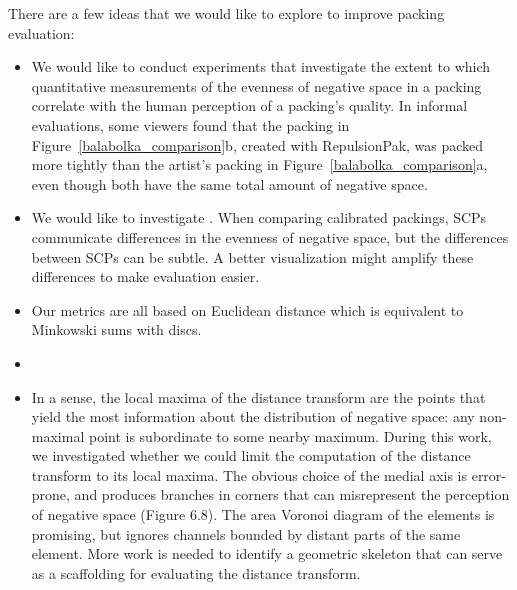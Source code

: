 \nnewtext
{
There are a few ideas that we would like to explore to improve packing evaluation:}
\begin{itemize}
\item We would like to conduct experiments that investigate the
extent to which quantitative measurements of the evenness of negative
space in a packing correlate with the human perception of a
packing's quality.  In informal evaluations, some viewers found that
the packing in Figure~\ref{balabolka_comparison}b, created with RepulsionPak,
was packed more tightly than the artist's packing in
Figure~\ref{balabolka_comparison}a, even though both have the same total
amount of negative space.

\item We would like to investigate .
When comparing calibrated packings, SCPs communicate 
differences in the evenness of negative space, but the differences 
between SCPs can be subtle.  A better visualization
might amplify these differences to make evaluation easier.

\item 
Our metrics are all based on Euclidean distance which is
equivalent to Minkowski sums with discs.

\item {}

\item
In a sense, the local maxima of the distance transform are 
the points that yield the most information about the distribution of negative space: 
any non-maximal point is subordinate to some nearby maximum. 
During this work, we investigated whether we could limit the computation of the distance transform to its local maxima. 
The obvious choice of the medial axis is error-prone, and produces branches in corners that can misrepresent 
the perception of negative space (Figure 6.8). 
The area Voronoi diagram of the elements is promising, but ignores channels bounded by distant parts of the same element. 
More work is needed to identify a geometric skeleton that can serve as a scaffolding for evaluating the distance transform. 


\end{itemize}
